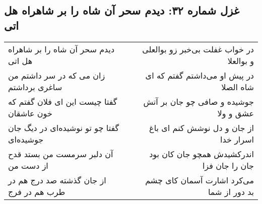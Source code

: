 \begin{center}
\section*{غزل شماره ۳۲: دیدم سحر آن شاه را بر شاهراه هل اتی}
\label{sec:0032}
\begin{longtable}{l p{0.5cm} r}
دیدم سحر آن شاه را بر شاهراه هل اتی
&&
در خواب غفلت بی‌خبر زو بوالعلی و بوالعلا
\\
زان می که در سر داشتم من ساغری برداشتم
&&
در پیش او می‌داشتم گفتم که ای شاه الصلا
\\
گفتا چیست این ای فلان گفتم که خون عاشقان
&&
جوشیده و صافی چو جان بر آتش عشق و ولا
\\
گفتا چو تو نوشیده‌ای در دیگ جان جوشیده‌ای
&&
از جان و دل نوشش کنم ای باغ اسرار خدا
\\
آن دلبر سرمست من بستد قدح از دست من
&&
اندرکشیدش همچو جان کان بود جان را جان فزا
\\
از جان گذشته صد درج هم در طرب هم در فرج
&&
می‌کرد اشارت آسمان کای چشم بد دور از شما
\\
\end{longtable}
\end{center}
